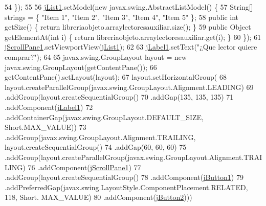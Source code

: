 \begin{DoxyCode}
54         \});
55 
56         \mbox{\hyperlink{class_interfaz_package_1_1_busqueda_lector_a79d4bc8896dcf47007cf4f1a138d8798}{jList1}}.setModel(\textcolor{keyword}{new} javax.swing.AbstractListModel() \{
57             String[] strings = \{ \textcolor{stringliteral}{"Item 1"}, \textcolor{stringliteral}{"Item 2"}, \textcolor{stringliteral}{"Item 3"}, \textcolor{stringliteral}{"Item 4"}, \textcolor{stringliteral}{"Item 5"} \};
58             \textcolor{keyword}{public} \textcolor{keywordtype}{int} getSize() \{ \textcolor{keywordflow}{return} libreriaobjeto.arraylectoresauxiliar.size(); \}
59             \textcolor{keyword}{public} Object getElementAt(\textcolor{keywordtype}{int} i) \{ \textcolor{keywordflow}{return} libreriaobjeto.arraylectoresauxiliar.get(i); \}
60         \});
61         \mbox{\hyperlink{class_interfaz_package_1_1_busqueda_lector_abc4a324ddee78d264865afedf117ff86}{jScrollPane1}}.setViewportView(\mbox{\hyperlink{class_interfaz_package_1_1_busqueda_lector_a79d4bc8896dcf47007cf4f1a138d8798}{jList1}});
62 
63         \mbox{\hyperlink{class_interfaz_package_1_1_busqueda_lector_a449890b71a3ddf1a45b169af153b364c}{jLabel1}}.setText(\textcolor{stringliteral}{"¿Que lector quiere comprar?"});
64 
65         javax.swing.GroupLayout layout = \textcolor{keyword}{new} javax.swing.GroupLayout(getContentPane());
66         getContentPane().setLayout(layout);
67         layout.setHorizontalGroup(
68             layout.createParallelGroup(javax.swing.GroupLayout.Alignment.LEADING)
69             .addGroup(layout.createSequentialGroup()
70                 .addGap(135, 135, 135)
71                 .addComponent(\mbox{\hyperlink{class_interfaz_package_1_1_busqueda_lector_a449890b71a3ddf1a45b169af153b364c}{jLabel1}})
72                 .addContainerGap(javax.swing.GroupLayout.DEFAULT\_SIZE, Short.MAX\_VALUE))
73             .addGroup(javax.swing.GroupLayout.Alignment.TRAILING, layout.createSequentialGroup()
74                 .addGap(60, 60, 60)
75                 .addGroup(layout.createParallelGroup(javax.swing.GroupLayout.Alignment.TRAILING)
76                     .addComponent(\mbox{\hyperlink{class_interfaz_package_1_1_busqueda_lector_abc4a324ddee78d264865afedf117ff86}{jScrollPane1}})
77                     .addGroup(layout.createSequentialGroup()
78                         .addComponent(\mbox{\hyperlink{class_interfaz_package_1_1_busqueda_lector_aafddbf0bf8e006576588abc987d139da}{jButton1}})
79                         .addPreferredGap(javax.swing.LayoutStyle.ComponentPlacement.RELATED, 118, Short.
      MAX\_VALUE)
80                         .addComponent(\mbox{\hyperlink{class_interfaz_package_1_1_busqueda_lector_a4c37aae2d858c81bf7cd2590bf39f62b}{jButton2}})))

\end{DoxyCode}
